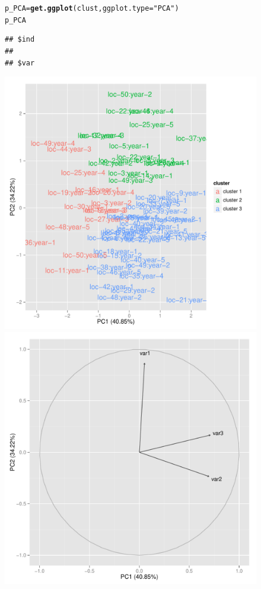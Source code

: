 \documentclass{article}\usepackage[]{graphicx}\usepackage[]{color}
\makeatletter
\newcommand{\hlstr}[1]{\textcolor[rgb]{0.192,0.494,0.8}{#1}}%
\newcommand{\hlstd}[1]{\textcolor[rgb]{0.345,0.345,0.345}{#1}}%
\newcommand{\hlkwb}[1]{\textcolor[rgb]{0.69,0.353,0.396}{#1}}%
\newcommand{\hlkwc}[1]{\textcolor[rgb]{0.333,0.667,0.333}{#1}}%
\newcommand{\hlkwd}[1]{\textcolor[rgb]{0.737,0.353,0.396}{\textbf{#1}}}%
\newenvironment{kframe}{%
 \def\at@end@of@kframe{}%
 \ifinner\ifhmode%
  \def\at@end@of@kframe{\end{minipage}}%
  \begin{minipage}{\columnwidth}%
 \fi\fi%
 \def\FrameCommand##1{\hskip\@totalleftmargin \hskip-\fboxsep
 \colorbox{shadecolor}{##1}\hskip-\fboxsep
     \hskip-\linewidth \hskip-\@totalleftmargin \hskip\columnwidth}%
 \MakeFramed {\advance\hsize-\width
   \@totalleftmargin\z@ \linewidth\hsize
   \@setminipage}}%
 {\par\unskip\endMakeFramed%
 \at@end@of@kframe}
\newenvironment{knitrout}{}{} %
\makeatother
\begin{document}
\begin{figure}[H]
\begin{knitrout}
\color{fgcolor}\begin{kframe}
\begin{alltt}
\hlstd{p_PCA} \hlkwb{=} \hlkwd{get.ggplot}\hlstd{(clust,} \hlkwc{ggplot.type} \hlstd{=} \hlstr{"PCA"}\hlstd{)}
\hlstd{p_PCA}
\end{alltt}
\begin{verbatim}
## $ind
## 
## $var
\end{verbatim}
\end{kframe}


{\centering \includegraphics[width=.6\textwidth]{figures/PPBstats_unnamed-chunk-51-1} 
\includegraphics[width=.6\textwidth]{figures/PPBstats_unnamed-chunk-51-2} 

}



\end{knitrout}
\end{figure}
\end{document}

